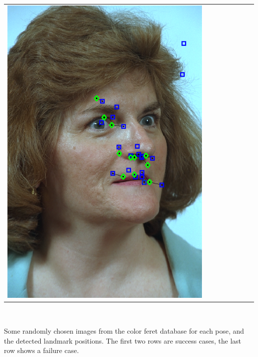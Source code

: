 \documentclass[landscape,final,a0paper,fontscale=0.27065]{baposter}
\begin{document}
\begin{poster}
{{\begin{tabular}{@{}rccccccc@{}}
 \parbox[c]{0.11\linewidth}{\includegraphics[width=\linewidth]{images/l_rc_fail.pdf}} 
 \end{tabular}
   }\\[-1em]
       \begin{multicols}{2}
 Some randomly chosen images from the color feret database for each
 pose, and the detected landmark positions. The first two rows are success
 cases, the last row shows a failure case. 
       \end{multicols}
 }
\end{poster}
\end{document}

